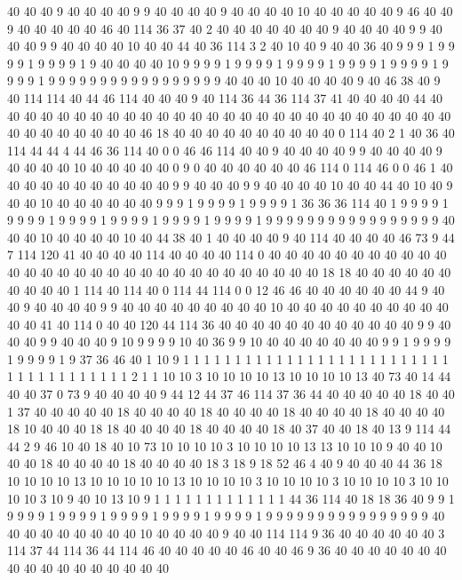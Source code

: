 40 40 40 9 40 40 40 40 9 9 40 40 40 40 9 40 40 40 40 10
40 40 40 40 40 9 46 40 40 9 40 40 40 40 40 46 40 114 36 37
40 2 40 40 40 40 40 40 40 9 40 40 40 40 9 9 40 40 40 9
9 40 40 40 40 10 40 40 44 40 36 114 3 2 40 10 40 9 40 40
36 40 9 9 9 1 9 9 9 9 1 9 9 9 9 1 9 40 40 40
40 10 9 9 9 9 1 9 9 9 9 1 9 9 9 9 1 9 9 9
9 1 9 9 9 9 1 9 9 9 9 1 9 9 9 9 9 9 9 9
9 9 9 9 9 9 9 9 9 40 40 40 10 40 40 40 40 9 40 46
38 40 9 40 114 114 40 44 46 114 40 40 40 9 40 114 36 44 36 114
37 41 40 40 40 40 44 40 40 40 40 40 40 40 40 40 40 40 40 40
40 40 40 40 40 40 40 40 40 40 40 40 40 40 40 40 40 40 40 40
40 40 40 46 18 40 40 40 40 40 40 40 40 40 40 0 114 40 2 1
40 36 40 114 44 44 4 44 46 36 114 40 0 0 46 46 114 40 40 9
40 40 40 40 9 9 40 40 40 40 9 40 40 40 40 10 40 40 40 40
40 0 9 0 40 40 40 40 40 40 46 114 0 114 46 0 0 46 1 40
40 40 40 40 40 40 40 40 40 40 9 9 40 40 40 9 9 40 40 40
40 10 40 40 44 40 10 40 9 40 40 10 40 40 40 40 40 40 9 9
9 1 9 9 9 9 1 9 9 9 9 1 36 36 36 114 40 1 9 9
9 9 1 9 9 9 9 1 9 9 9 9 1 9 9 9 9 1 9 9
9 9 1 9 9 9 9 1 9 9 9 9 9 9 9 9 9 9 9 9
9 9 9 9 9 40 40 40 10 40 40 40 40 10 40 44 38 40 1 40
40 40 40 9 40 114 40 40 40 40 46 73 9 44 7 114 120 41 40 40
40 40 114 40 40 40 40 114 0 40 40 40 40 40 40 40 40 40 40 40
40 40 40 40 40 40 40 40 40 40 40 40 40 40 40 40 40 40 40 18
18 40 40 40 40 40 40 40 40 40 40 1 114 40 114 40 0 114 44 114
0 0 12 46 46 40 40 40 40 40 40 44 9 40 40 9 40 40 40 40
9 9 40 40 40 40 40 40 40 40 40 10 40 40 40 40 40 40 40 40
40 40 40 40 41 40 114 0 40 40 120 44 114 36 40 40 40 40 40 40
40 40 40 40 40 40 9 9 40 40 40 9 9 40 40 40 9 10 9 9
9 9 10 40 36 9 9 10 40 40 40 40 40 40 40 9 9 1 9 9
9 9 1 9 9 9 9 1 9 37 36 46 40 1 10 9 1 1 1 1
1 1 1 1 1 1 1 1 1 1 1 1 1 1 1 1 1 1 1 1
1 1 1 1 1 1 1 1 1 1 1 1 1 1 2 1 1 10 10 3
10 10 10 10 13 10 10 10 10 13 40 73 40 14 44 40 40 37 0 73
9 40 40 40 40 9 44 12 44 37 46 114 37 36 44 40 40 40 40 40
18 40 40 1 37 40 40 40 40 40 18 40 40 40 40 18 40 40 40 40
18 40 40 40 40 18 40 40 40 40 18 10 40 40 40 18 18 40 40 40
40 18 40 40 40 40 18 40 37 40 40 18 40 13 9 114 44 44 2 9
46 10 40 18 40 10 73 10 10 10 10 3 10 10 10 10 13 13 10 10
10 9 40 40 10 40 40 18 40 40 40 40 18 40 40 40 40 18 3 18
9 18 52 46 4 40 9 40 40 40 44 36 18 10 10 10 10 13 10 10
10 10 10 13 10 10 10 10 3 10 10 10 10 3 10 10 10 10 3 10
10 10 10 3 10 9 40 10 13 10 9 1 1 1 1 1 1 1 1 1
1 1 1 1 44 36 114 40 18 18 36 40 9 9 1 9 9 9 9 1
9 9 9 9 1 9 9 9 9 1 9 9 9 9 1 9 9 9 9 1
9 9 9 9 9 9 9 9 9 9 9 9 9 9 9 9 40 40 40 40
40 40 40 40 40 10 40 40 40 40 9 40 40 114 114 9 36 40 40 40
40 40 40 3 114 37 44 114 36 44 114 46 40 40 40 40 40 46 40 40
46 9 36 40 40 40 40 40 40 40 40 40 40 40 40 40 40 40 40 40
